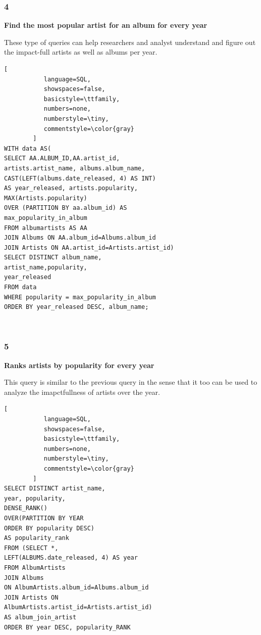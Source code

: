 \documentclass[conference]{IEEEtran}
\begin{document}
\subsubsection*{4} \textbf{Find the most popular artist for an album for every year}

These type of queries can help researchers and analyst understand and figure out the impact-full artists as well as albums per year. \linebreak

\begin{lstlisting}[
           language=SQL,
           showspaces=false,
           basicstyle=\ttfamily,
           numbers=none,
           numberstyle=\tiny,
           commentstyle=\color{gray}
        ]
WITH data AS(
SELECT AA.ALBUM_ID,AA.artist_id,
artists.artist_name, albums.album_name, 
CAST(LEFT(albums.date_released, 4) AS INT) 
AS year_released, artists.popularity,
MAX(Artists.popularity) 
OVER (PARTITION BY aa.album_id) AS
max_popularity_in_album
FROM albumartists AS AA
JOIN Albums ON AA.album_id=Albums.album_id
JOIN Artists ON AA.artist_id=Artists.artist_id)
SELECT DISTINCT album_name, 
artist_name,popularity,
year_released
FROM data
WHERE popularity = max_popularity_in_album
ORDER BY year_released DESC, album_name;
\end{lstlisting} \ 

\subsubsection*{5} \textbf{Ranks artists by popularity for every year}

This query is similar to the previous query in the sense that it too can be used to analyze the imapctfullness of artists over the year. \linebreak

\begin{lstlisting}[
           language=SQL,
           showspaces=false,
           basicstyle=\ttfamily,
           numbers=none,
           numberstyle=\tiny,
           commentstyle=\color{gray}
        ]
SELECT DISTINCT artist_name, 
year, popularity, 
DENSE_RANK() 
OVER(PARTITION BY YEAR 
ORDER BY popularity DESC) 
AS popularity_rank
FROM (SELECT *,
LEFT(ALBUMS.date_released, 4) AS year
FROM AlbumArtists
JOIN Albums 
ON AlbumArtists.album_id=Albums.album_id
JOIN Artists ON 
AlbumArtists.artist_id=Artists.artist_id) 
AS album_join_artist
ORDER BY year DESC, popularity_RANK
\end{lstlisting} \ 
\end{document}

